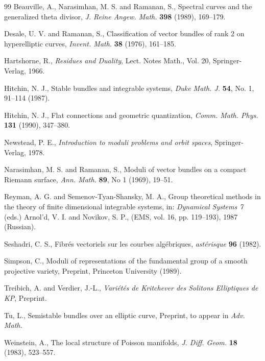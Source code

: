 \documentclass[12pt,a4paper,oneside,english]{smfart}
\theoremstyle{definition}
\theoremstyle{remark}
\begin{document}
\begin{thebibliography}{99}
 Beauville, A., Narasimhan, M. S. and Ramanan, S., Spectral curves and the generalized theta divisor, \emph{J. Reine Angew. Math.} \textbf{398} (1989), 169--179.

 Desale, U. V. and Ramanan, S., Classification of vector bundles of rank 2 on hyperelliptic curves, \emph{Invent. Math.} \textbf{38} (1976), 161--185.

 Hartshorne, R., \emph{Residues and Duality}, Lect. Notes Math., Vol. 20, Springer-Verlag, 1966.

 Hitchin, N. J., Stable bundles and integrable systems, \emph{Duke Math. J.} \textbf{54}, No. 1, 91--114 (1987).

 Hitchin, N. J., Flat connections and geometric quantization, \emph{Comm. Math. Phys.} \textbf{131} (1990), 347--380.

 Newstead, P. E., \emph{Introduction to moduli problems and orbit spaces}, Springer-Verlag, 1978.

 Narasimhan, M. S. and Ramanan, S., Moduli of vector bundles on a compact Riemann surface, \emph{Ann. Math.} \textbf{89}, No 1 (1969), 19--51.

 Reyman, A. G. and Semenov-Tyan-Shansky, M. A., Group theoretical methods in the theory of finite dimensional integrable systems, in: \emph{Dynamical Systems 7} (eds.) Arnol'd, V. I. and Novikov, S. P., (EMS, vol. 16, pp. 119--193), 1987 (Russian).

 Seshadri, C. S., Fibr\'es vectoriels sur les courbes alg\'ebriques, \emph{ast\'erisque} \textbf{96} (1982).

 Simpson, C., Moduli of representations of the fundamental group of a smooth projective variety, Preprint, Princeton University (1989).

 Treibich, A. and Verdier, J.-L., \emph{Vari\'et\'es de Kritchever des Solitons Elliptiques de KP}, Preprint.

 Tu, L., Semistable bundles over an elliptic curve, Preprint, to appear in \emph{Adv. Math.}

 Weinstein, A., The local structure of Poisson manifolds, \emph{J. Diff. Geom.} \textbf{18} (1983), 523--557.

\end{thebibliography}
\end{document}
